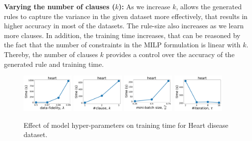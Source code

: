	{\textbf{Varying the number of clauses ($ k $): }}
	As we increase  $ k $, {\crr} allows the generated rules to capture the variance in the given dataset more effectively, that results in higher  accuracy in most of the datasets. The  rule-size also increases as we learn more clauses. In addition, the training time  increases, that can be reasoned by the fact that the number of constraints in the MILP formulation is linear with $ k $. Thereby, the number of clauses $ k $ provides a control over the accuracy of the generated rule and training time. 
	 
	 \begin{figure}[btp]
	 	\centering
	 	\subfloat
	 	{\includegraphics[width=0.23\textwidth]{figures/interpretability/relaxed-cnf/heart_time_vary_lambda.pdf}\label{interpretability_crr_fig:c}} \hfill
	 	\subfloat
	 	{\includegraphics[width=0.23\textwidth]{figures/interpretability/relaxed-cnf/heart_time_vary_clause.pdf}\label{interpretability_crr_fig:h}} \hfill
	 		\subfloat
	 		{\includegraphics[width=0.23\textwidth]{figures/interpretability/relaxed-cnf/heart_time_vary_subsamplesize.pdf}\label{interpretability_crr_fig:b}} \hfill 
	 		\subfloat
	 		{\includegraphics[width=0.23\textwidth]{figures/interpretability/relaxed-cnf/heart_time_vary_iteration.pdf}\label{interpretability_crr_fig:e}} \hfill
	 	\caption[Effect of hyper-parameters on training time in {\crr}]{Effect of model hyper-parameters on training  time for  Heart disease dataset.} 
	 	
	 	\label{interpretability_crr_fig:result_3}
	 \end{figure}
	 
